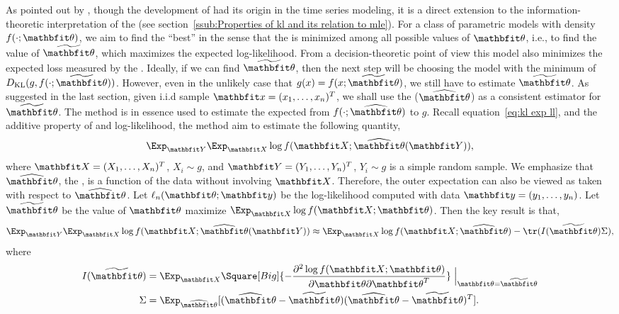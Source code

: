 \documentclass[10pt, hyper, bib, fontset=Lucida,
linespread=1.3, typearearatio=0.75]{marticle}
\begin{document}
As pointed out by \textcite{Bozdogan:1987wy}, though the development of \aic
had its origin in the time series modeling, it is a direct extension to the
information-theoretic interpretation of the \mle (see
section~\ref{ssub:Properties of kl and its relation to mle}). For a class of
parametric models with density $f(\cdot;\bth)$, we aim to find the ``best'' in
the sense that the \kl is minimized among all possible values of $\bth$, i.e.,
to find the value of $\tbth$, which maximizes the expected log-likelihood.
From a decision-theoretic point of view this model also minimizes the expected
loss measured by the \kl \parencite{Akaike:1973uc}. Ideally, if we can find
$\tbth$, then the next step will be choosing the model with the minimum of
$D_{\mathrm{KL}}(g,f(\cdot;\tbth))$. However, even in the unlikely case that
$g(x) = f(x;\tbth)$, we still have to estimate $\tbth$. As suggested in the
last section, given i.i.d sample $\bfx = (x_1,\dots,x_n)^T$, we shall use the
\mle ($\hbth$) as a consistent estimator for $\tbth$. The \aic method is in
essence used to estimate the expected \kl from $f(\cdot; \hbth)$ to $g$.
Recall equation~\eqref{eq:kl exp ll}, and the additive property of \kl and
log-likelihood, the \aic method aim to estimate the following quantity,
\begin{equation}
  \Exp_{\bfY}\Exp_{\bfX}\log f(\bfX;\hbth(\bfY)),
\end{equation}
where $\bfX = (X_1,\dots,X_n)^T$, $X_i \sim g$, and $\bfY =
(Y_1,\dots,Y_n)^T$, $Y_i \sim g$ is a simple random sample. We emphasize that
$\hbth$, the \mle, is a function of the data without involving $\bfX$.
Therefore, the outer expectation can also be viewed as taken with respect to
$\hbth$. Let $\ell_n(\bth;\bfy)$ be the log-likelihood computed with data
$\bfy = (y_1,\dots,y_n)$. Let $\tbth$ be the value of $\bth$ maximize
$\Exp_{\bfX}\log f(\bfX;\bth)$. Then the key result is that,
\begin{equation}
  \Exp_{\bfY}\Exp_{\bfX}\log f(\bfX;\hbth(\bfY))
  \approx \Exp_{\bfX}\log f(\bfX;\hbth) - \tr(I(\tbth)\Sigma),
  \label{eq:aic general}
\end{equation}
where
\begin{align}
  I(\tbth)
  & = \Exp_{\bfX}\Square[Big]{
    -\frac{\partial^2\log f(\bfX;\bth)}{\partial\bth\partial\bth^T}}
  \Bigm|_{\bth=\tbth} \\
  \Sigma &= \Exp_{\hbth}[(\hbth-\tbth)(\hbth-\tbth)^T].
\end{align}
\end{document}
